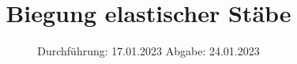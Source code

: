 

%

\subject{V103}
\title{Biegung elastischer Stäbe}
\date{%
  Durchführung: 17.01.2023
  \hspace{3em}
  Abgabe: 24.01.2023
}


\setlength{\parindent}{0pt} %

\maketitle
\thispagestyle{empty}
\tableofcontents
\newpage







\printbibliography{}




